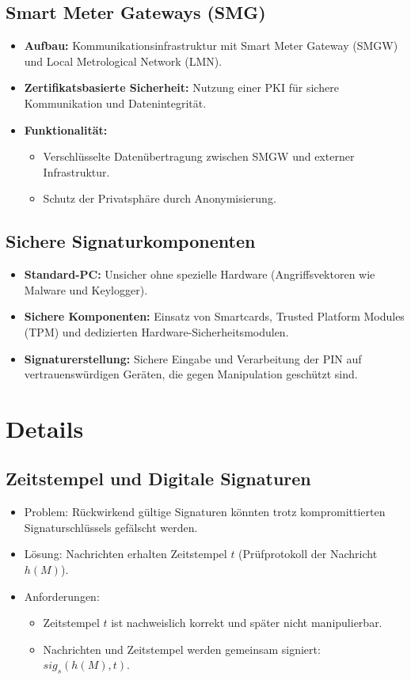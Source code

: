 \documentclass{article}
\begin{document}
\subsection{Smart Meter Gateways (SMG)}
\begin{itemize}
    \item \textbf{Aufbau:} Kommunikationsinfrastruktur mit Smart Meter Gateway (SMGW) und Local Metrological Network (LMN).
    \item \textbf{Zertifikatsbasierte Sicherheit:} Nutzung einer PKI für sichere Kommunikation und Datenintegrität.
    \item \textbf{Funktionalität:}
    \begin{itemize}
        \item Verschlüsselte Datenübertragung zwischen SMGW und externer Infrastruktur.
        \item Schutz der Privatsphäre durch Anonymisierung.
    \end{itemize}
\end{itemize}

\subsection{Sichere Signaturkomponenten}
\begin{itemize}
    \item \textbf{Standard-PC:} Unsicher ohne spezielle Hardware (Angriffsvektoren wie Malware und Keylogger).
    \item \textbf{Sichere Komponenten:} Einsatz von Smartcards, Trusted Platform Modules (TPM) und dedizierten Hardware-Sicherheitsmodulen.
    \item \textbf{Signaturerstellung:} Sichere Eingabe und Verarbeitung der PIN auf vertrauenswürdigen Geräten, die gegen Manipulation geschützt sind.
\end{itemize}




\section{Details}

\subsection{Zeitstempel und Digitale Signaturen}
\begin{itemize}
    \item Problem: Rückwirkend gültige Signaturen könnten trotz kompromittierten Signaturschlüssels gefälscht werden.
    \item Lösung: Nachrichten erhalten Zeitstempel $t$ (Prüfprotokoll der Nachricht $h(M)$).
    \item Anforderungen:
    \begin{itemize}
        \item Zeitstempel $t$ ist nachweislich korrekt und später nicht manipulierbar.
        \item Nachrichten und Zeitstempel werden gemeinsam signiert: $sig_s(h(M), t)$.
    \end{itemize}
\end{itemize}
\end{document}
